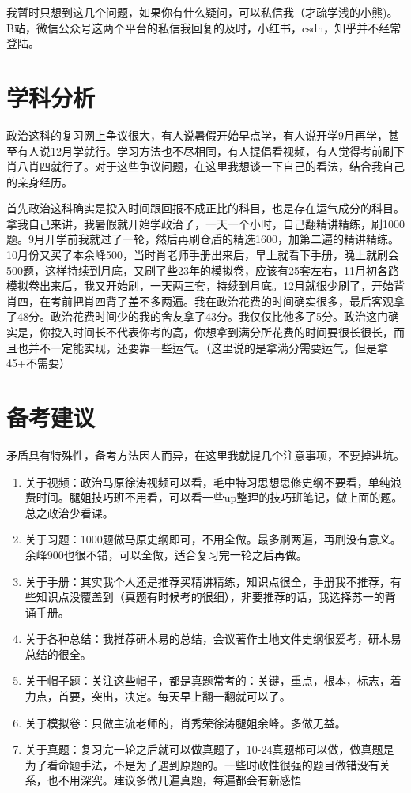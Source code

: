 \documentclass[lang=cn,newtx,10pt,scheme=chinese,pad,twocol]{zznote}
\begin{document}
\begin{note}
	我暂时只想到这几个问题，如果你有什么疑问，可以私信我（才疏学浅的小熊)。B站，微信公众号这两个平台的私信我回复的及时，小红书，csdn，知乎并不经常登陆。
\end{note}

\section{学科分析}
政治这科的复习网上争议很大，有人说暑假开始早点学，有人说开学9月再学，甚至有人说12月学就行。学习方法也不尽相同，有人提倡看视频，有人觉得考前刷下肖八肖四就行了。对于这些争议问题，在这里我想谈一下自己的看法，结合我自己的亲身经历。

首先政治这科确实是投入时间跟回报不成正比的科目，也是存在运气成分的科目。拿我自己来讲，我暑假就开始学政治了，一天一个小时，自己翻精讲精练，刷1000题。9月开学前我就过了一轮，然后再刷仓盾的精选1600，加第二遍的精讲精练。10月份又买了本余峰500，当时肖老师手册出来后，早上就看下手册，晚上就刷会500题，这样持续到月底，又刷了些23年的模拟卷，应该有25套左右，11月初各路模拟卷出来后，我又开始刷，一天两三套，持续到月底。12月就很少刷了，开始背肖四，在考前把肖四背了差不多两遍。我在政治花费的时间确实很多，最后客观拿了48分。政治花费时间少的我的舍友拿了43分。我仅仅比他多了5分。政治这门确实是，你投入时间长不代表你考的高，你想拿到满分所花费的时间要很长很长，而且也并不一定能实现，还要靠一些运气。（这里说的是拿满分需要运气，但是拿45+不需要）



\section{备考建议}
\begin{definition}
	矛盾具有特殊性，备考方法因人而异，在这里我就提几个注意事项，不要掉进坑。
\end{definition}
\begin{enumerate}

	\item {关于视频：政治马原徐涛视频可以看，毛中特习思想思修史纲不要看，单纯浪费时间。腿姐技巧班不用看，可以看一些up整理的技巧班笔记，做上面的题。总之政治少看课。}
	\item {关于习题：1000题做马原史纲即可，不用全做。最多刷两遍，再刷没有意义。余峰900也很不错，可以全做，适合复习完一轮之后再做。}
	\item {关于手册：其实我个人还是推荐买精讲精练，知识点很全，手册我不推荐，有些知识点没覆盖到（真题有时候考的很细），非要推荐的话，我选择苏一的背诵手册。}
	\item {关于各种总结：我推荐研木易的总结，会议著作土地文件史纲很爱考，研木易总结的很全。}
	\item {关于帽子题：关注这些帽子，都是真题常考的：关键，重点，根本，标志，着力点，首要，突出，决定。每天早上翻一翻就可以了。}
	\item {关于模拟卷：只做主流老师的，肖秀荣徐涛腿姐余峰。多做无益。}
	\item {关于真题：复习完一轮之后就可以做真题了，10-24真题都可以做，做真题是为了看命题手法，不是为了遇到原题的。一些时政性很强的题目做错没有关系，也不用深究。建议多做几遍真题，每遍都会有新感悟}

\end{enumerate}
\end{document}
